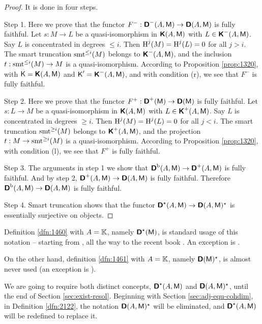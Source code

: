 \begin{proof} It is done in four steps. 

\smallskip \noindent
Step 1. Here we prove that the functor 
$F^- : \boldsymbol{\mathsf{D}}^-(A, \operatorname{\mathsf{M}}) \to \boldsymbol{\mathsf{D}}(A, \operatorname{\mathsf{M}})$ 
is fully faithful.
Let $s : M \to L$ be a quasi-isomorphism in 
$\boldsymbol{\mathsf{K}}(A, \operatorname{\mathsf{M}})$ with 
$L \in \boldsymbol{\mathsf{K}}^-(A, \operatorname{\mathsf{M}})$.
Say $L$ is concentrated in degrees $\leq i$.
Then $\operatorname{H}^j(M) = \operatorname{H}^j(L) = 0$ for all $j > i$. 
The smart truncation $\operatorname{smt}^{\leq i}(M)$ belongs to 
$\boldsymbol{\mathsf{K}}^-(A, \operatorname{\mathsf{M}})$, and the inclusion
$t : \operatorname{smt}^{\leq i}(M) \to M$ is a quasi-isomorphism. 
According to Proposition \ref{prop:1320}, with 
$\operatorname{\mathsf{K}} = \boldsymbol{\mathsf{K}}(A, \operatorname{\mathsf{M}})$ and 
$\operatorname{\mathsf{K}}' = \boldsymbol{\mathsf{K}}^-(A, \operatorname{\mathsf{M}})$, and with condition (r), we see that 
$F^-$ is fully faithful.

\medskip \noindent 
Step 2. Here we prove that the functor 
$F^+ : \boldsymbol{\mathsf{D}}^+(\operatorname{\mathsf{M}}) \to \boldsymbol{\mathsf{D}}(\operatorname{\mathsf{M}})$ 
is fully faithful.
Let $s : L \to M$ be a quasi-isomorphism in 
$\boldsymbol{\mathsf{K}}(A, \operatorname{\mathsf{M}})$ with $L \in \boldsymbol{\mathsf{K}}^+(A, \operatorname{\mathsf{M}})$.
Say $L$ is concentrated in degrees $\geq i$. 
Then $\operatorname{H}^j(M) = \operatorname{H}^j(L) = 0$ for all $j < i$. 
The smart truncation 
$\operatorname{smt}^{\geq i}(M)$ belongs to $\boldsymbol{\mathsf{K}}^+(A, \operatorname{\mathsf{M}})$, 
and the projection 
$t : M \to \operatorname{smt}^{\geq i}(M)$ is a quasi-isomorphism. 
According to Proposition \ref{prop:1320}, with condition (l), we see that 
$F^+$ is fully faithful.

\medskip \noindent 
Step 3. The arguments in step 1 we show that 
$\boldsymbol{\mathsf{D}}^{\mathrm{b}}(A, \operatorname{\mathsf{M}}) \to \boldsymbol{\mathsf{D}}^{+}(A, \operatorname{\mathsf{M}})$
is fully faithful. And by step 2, 
$\boldsymbol{\mathsf{D}}^{+}(A, \operatorname{\mathsf{M}}) \to \boldsymbol{\mathsf{D}}(A, \operatorname{\mathsf{M}})$ is fully faithful. 
Therefore 
$\boldsymbol{\mathsf{D}}^{\mathrm{b}}(A, \operatorname{\mathsf{M}}) \to \boldsymbol{\mathsf{D}}(A, \operatorname{\mathsf{M}})$
is fully faithful.

\medskip \noindent 
Step 4. Smart truncation shows that the functor
$\boldsymbol{\mathsf{D}}^{\star}(A, \operatorname{\mathsf{M}}) \to \boldsymbol{\mathsf{D}}(A, \operatorname{\mathsf{M}})^{\star}$ 
is essentially surjective on objects. 
\end{proof}

\begin{rem} \label{rem:1461}
Definition \ref{dfn:1460} with $A = \mathbb{K}$, namely $\boldsymbol{\mathsf{D}}^{\star}(\operatorname{\mathsf{M}})$,
is standard usage of this notation -- starting from \cite[Section I.4]{RD}, all 
the way to the recent book \cite[Definition 13.1.2]{KaSc2}. An exception is 
\cite[Definition tag=05RU]{SP}. 

On the other hand, definition \ref{dfn:1461} with $A = \mathbb{K}$, namely 
$\boldsymbol{\mathsf{D}}(\operatorname{\mathsf{M}})^{\star}$, 
is almost never used (an exception is \cite{PSY3}). 

We are going to require both distinct concepts,  
$\boldsymbol{\mathsf{D}}^{\star}(A, \operatorname{\mathsf{M}})$ and $\boldsymbol{\mathsf{D}}(A, \operatorname{\mathsf{M}})^{\star}$,
until the end of Section \ref{sec:exist-resol}. Beginning with 
Section \ref{sec:adj-equ-cohdim}, in Definition \ref{dfn:2122}, the notation 
$\boldsymbol{\mathsf{D}}(A, \operatorname{\mathsf{M}})^{\star}$ will be eliminated, and 
$\boldsymbol{\mathsf{D}}^{\star}(A, \operatorname{\mathsf{M}})$ will be redefined to replace it. 
\end{rem}


